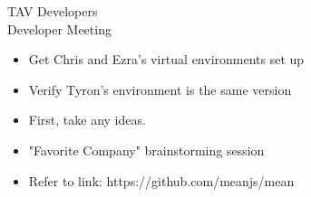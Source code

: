 \documentclass{article}
\begin{document}
\begin{Minutes}{TAV Developers\\Developer Meeting}

\missingExcused{%
}

\missingNoExcuse{%
}


\starttime{}
\endtime{}


\maketitle

\begin{itemize}
	\item Get Chris and Ezra's virtual environments set up 
	\item Verify Tyron's environment is the same version
\end{itemize}

\begin{itemize}
	\item First, take any ideas.
	\item "Favorite Company" brainstorming session
\end{itemize}

\begin{itemize}
	\item Refer to link: https://github.com/meanjs/mean
\end{itemize}

\thispagestyle{creditfooter}

\end{Minutes}
\end{document}
